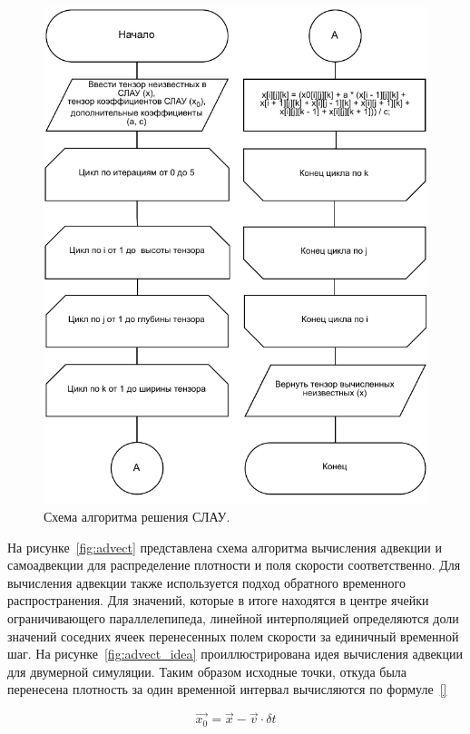 \begin{figure}[H]
	\centering
	\includegraphics[width=1.0\textwidth,page=1]{assets/img/gauss-zeidel.pdf}
	\caption{Схема алгоритма решения СЛАУ.}
	\label{fig:lin_solve}
\end{figure}

На рисунке~\ref{fig:advect} представлена схема алгоритма вычисления адвекции и самоадвекции для распределение плотности и поля скорости соответственно. Для вычисления адвекции также используется подход обратного временного распространения. Для значений, которые в итоге находятся в центре ячейки ограничивающего параллелепипеда, линейной интерполяцией определяются доли значений соседних ячеек перенесенных полем скорости за единичный временной шаг. На рисунке~\ref{fig:advect_idea} проиллюстрирована идея вычисления адвекции для двумерной симуляции. Таким образом исходные точки, откуда была перенесена плотность за один временной интервал вычисляются по формуле~\ref{}

\begin{equation}
	\vec{x_0} = \vec{x} - \vec{v} \cdot \delta t
\end{equation}

